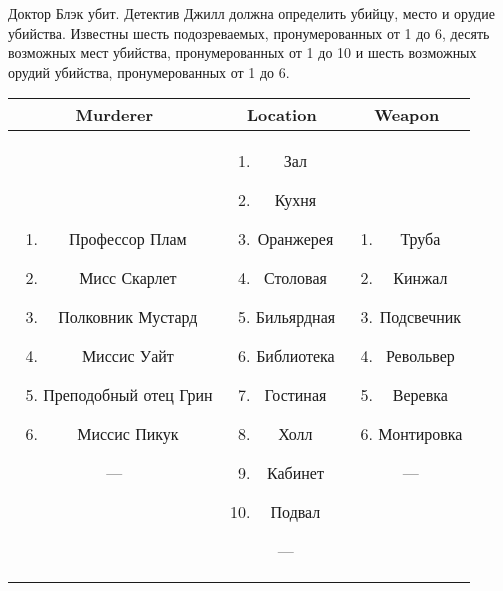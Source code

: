 Доктор Блэк убит. Детектив Джилл должна определить убийцу, место и орудие убийства. 
Известны шесть подозреваемых, пронумерованных от 1 до 6, десять возможных мест убийства, 
пронумерованных от 1 до 10 и шесть возможных орудий убийства, пронумерованных от 1 до 6. 

\begin{center}
\renewcommand{\arraystretch}{1.5}
\begin{tabular}{|c|c|c|}
\hline
Murderer & Location & Weapon \\
\hline
\parbox{5cm}{\centering \vspace{2mm}
\begin{enumerate}
\item Профессор Плам
\item Мисс Скарлет
\item Полковник Мустард
\item Миссис Уайт
\item Преподобный отец Грин
\item Миссис Пикук
\end{enumerate}---\\
\vspace{2mm}} & 
\parbox{5cm}{\centering \vspace{2mm}
\begin{enumerate}
\item Зал
\item Кухня
\item Оранжерея
\item Столовая
\item Бильярдная
\item Библиотека
\item Гостиная
\item Холл
\item Кабинет
\item Подвал
\end{enumerate}~--- \\
\vspace{2mm}} &
\parbox{5cm}{\centering \vspace{2mm}
\begin{enumerate}
\item Труба
\item Кинжал
\item Подсвечник
\item Револьвер
\item Веревка
\item Монтировка
\end{enumerate}~--- \\
\vspace{2mm}} \\
\hline
\end{tabular}
\end{center}



